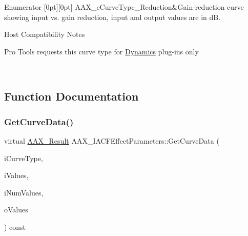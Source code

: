 \begin{DoxyEnumFields}{Enumerator}
[0pt][0pt]{}\mbox{\label{a00812_gga59c73d8f51c5c55d54a728eff39da884a011b1b00d6189a8903735dcae2f8bc93}} 
A\+A\+X\+\_\+e\+Curve\+Type\+\_\+\+Reduction&Gain-\/reduction curve showing input vs. gain reduction, input and output values are in dB. \begin{DoxyRefDesc}{Host Compatibility Notes}
\item[\mbox{\hyperlink{a00786__compatibility_notes000031}{Host Compatibility Notes}}]Pro Tools requests this curve type for \mbox{\hyperlink{a00491_aef9637518fb1ac0e2f403444c73aba4aa1e8d5202983c58aa0346a9a547f55bd9}{Dynamics}} plug-\/ins only \end{DoxyRefDesc}
\\
\hline

\end{DoxyEnumFields}


\subsection{Function Documentation}
\mbox{\label{a00812_gaa85bda4027342eb644a9c92a17da6d49}} 
\subsubsection{\texorpdfstring{GetCurveData()}{GetCurveData()}}
{\footnotesize\ttfamily virtual \mbox{\hyperlink{a00392_a4d8f69a697df7f70c3a8e9b8ee130d2f}{A\+A\+X\+\_\+\+Result}} A\+A\+X\+\_\+\+I\+A\+C\+F\+Effect\+Parameters\+::\+Get\+Curve\+Data (\begin{DoxyParamCaption}\item[{\mbox{\hyperlink{a00392_ac678f9c1fbcc26315d209f71a147a175}{A\+A\+X\+\_\+\+C\+Type\+ID}}}]{i\+Curve\+Type,  }\item[{const float $\ast$}]{i\+Values,  }\item[{uint32\+\_\+t}]{i\+Num\+Values,  }\item[{float $\ast$}]{o\+Values }\end{DoxyParamCaption}) const\hspace{0.3cm}{\ttfamily [pure virtual]}}



